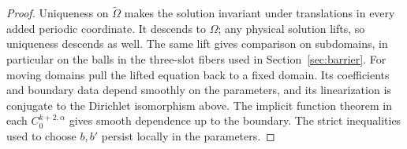 \begin{proof}
Uniqueness on $\widetilde\Omega$ makes the solution invariant under
translations in every added periodic coordinate. It descends to
$\Omega$; any physical solution lifts, so uniqueness descends as well.
The same lift gives comparison on subdomains, in particular on the
balls in the three-slot fibers used in Section~\ref{sec:barrier}.
For moving domains pull the lifted equation back to a fixed domain.
Its coefficients and boundary data depend smoothly on the parameters,
and its linearization is conjugate to the Dirichlet isomorphism above.
The implicit function theorem in each $C^{k+2,\alpha}_0$ gives smooth
dependence up to the boundary. The strict inequalities used to choose
$b,b'$ persist locally in the parameters.
\end{proof}
